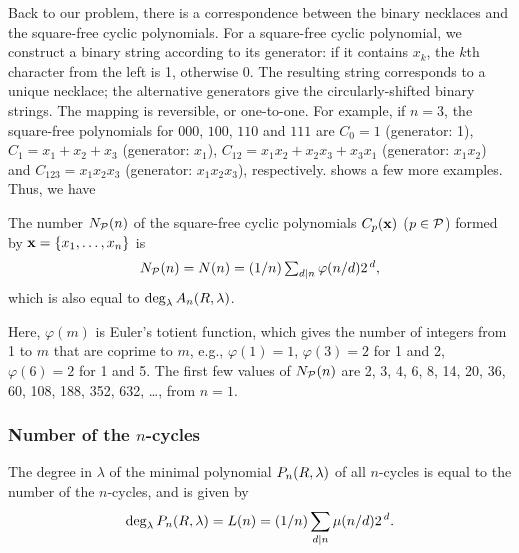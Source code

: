 \documentclass[twocolumn]{revtex4-1}
\begin{document}
Back to our problem, there is
  a correspondence between the binary necklaces
  and the square-free cyclic polynomials.
For a square-free cyclic polynomial,
  we construct a binary string according to its generator:
if it contains $x_k$, the $k$th character from the left is 1,
  otherwise 0.
The resulting string corresponds to a unique necklace;
  the alternative generators give
  the circularly-shifted binary strings.
The mapping is reversible, or one-to-one.
%
For example, if $n = 3$,
 the square-free polynomials for $000$, $100$, $110$ and $111$ are
  $C_0 = 1$ (generator: 1),
  $C_1 = x_1 + x_2 + x_3$ (generator: $x_1$),
  $C_{12} = x_1 x_2 + x_2 x_3 + x_3 x_1$ (generator: $x_1 x_2$)
  and $C_{123} = x_1 x_2 x_3$ (generator: $x_1 x_2 x_3$), respectively.
 shows a few more examples.
%
Thus, we have \cite{riordan}
%
\begin{theorem}
The number $N_\mathcal P(n)$ of the square-free cyclic polynomials $C_p(\mathbf{x})$ ($p \in \mathcal P$)
  formed by $\mathbf{x} = \{x_1, \ldots, x_n\}$ is
\begin{equation}
  N_\mathcal P(n) = N(n) = (1/n) \textstyle\sum_{d|n} \varphi(n/d) 2^{\,d},
\label{eq:necklace}
\end{equation}
%
which is also equal to $\deg_\lambda A_n(R, \lambda)$.
\label{thm:necklace}
\end{theorem}
%
Here, $\varphi(m)$ is Euler's totient function,
which gives the number of integers from 1 to $m$
  that are coprime to $m$,
  e.g.,
  $\varphi(1) = 1$,
  $\varphi(3) = 2$ for 1 and 2,
  $\varphi(6) = 2$ for 1 and 5.
The first few values of $N_\mathcal P(n)$ are 2, 3, 4, 6, 8, 14, 20, 36, 60, 108, 188, 352, 632, \ldots,
  from $n = 1$.



\subsubsection{Number of the $n$-cycles}


\begin{theorem}
The degree in $\lambda$ of the minimal polynomial $P_n(R, \lambda)$ of all $n$-cycles
  is equal to the number of the $n$-cycles,
  and is given by
\begin{equation}
  \deg_\lambda P_n(R, \lambda) = L(n) = (1/n)\sum_{d | n} \mu(n/d) 2^{\,d}.
\label{eq:lyndon}
\end{equation}
\label{thm:lyndon}
\end{theorem}
\end{document}
